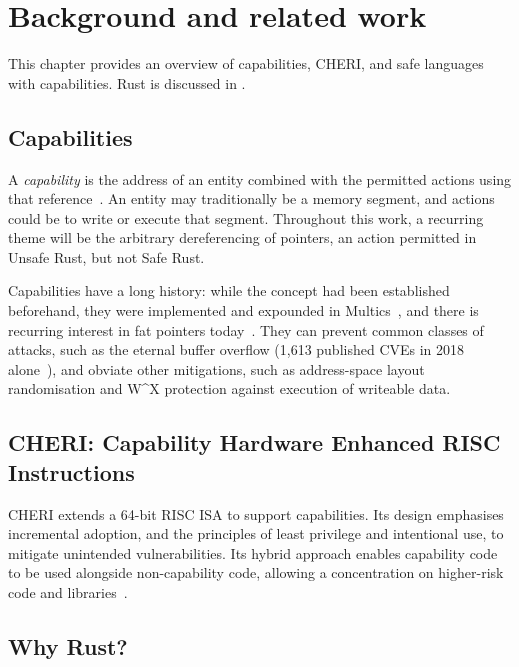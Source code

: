 \documentclass[dissertation.tex]{subfiles}
\begin{document}
\chapter{Background and related work}
\label{ch:bg}



 This chapter provides an overview of capabilities, CHERI,
and safe languages with capabilities.
Rust is discussed in .


\section{Capabilities}
A \emph{capability} is the address of an entity combined with the
permitted actions using that reference~\cite{Dennis:1966:PSM}.
An entity may traditionally be a memory segment, and actions could be to
write or execute that segment.
Throughout this work, a recurring theme will be the arbitrary
dereferencing of pointers, an action permitted in Unsafe Rust, but not
Safe Rust.

Capabilities have a long history: while the concept had been established
beforehand, they were implemented and expounded in
Multics~\cite{bell-lapadula}, and there is recurring interest in fat
pointers today~\cite{hardbound-devietti,lowfat-kwon}.
They can prevent common classes of attacks, such as the
eternal buffer overflow (1,613 published CVEs in 2018
alone~\cite{nist-nvd-overflow-2018}), and obviate other mitigations,
such as address-space layout randomisation and W\^{}X protection
against execution of writeable data.


\section{CHERI: Capability Hardware Enhanced RISC Instructions}
CHERI extends a 64-bit RISC ISA to support capabilities.
Its design emphasises incremental adoption, and the principles of least
privilege and intentional use, to mitigate unintended vulnerabilities.
Its hybrid approach enables capability code to be used alongside
non-capability code, allowing a concentration on higher-risk code and
libraries~\cite{cheri-v6}.


\section{Why Rust?}
\label{sec:bg-why-rust}
\end{document}
